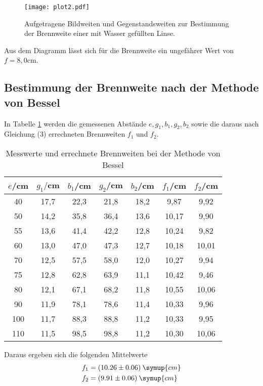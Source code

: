 \begin{figure}
  \centering
  \texttt{[image: plot2.pdf]}
  \caption{Aufgetragene Bildweiten und Gegenstandsweiten zur Bestimmung der Brennweite einer mit Wasser gefüllten Linse.}
  \label{fig:plot}
\end{figure}


Aus dem Diagramm lässt sich für die Brennweite ein ungefährer Wert von  $f = 8,0$cm.


\subsection{Bestimmung der Brennweite nach der Methode von Bessel}
In Tabelle \ref{tab:bessel} werden die gemessenen Abstände $e, g_1, b_1, g_2, b_2$ sowie die daraus nach Gleichung (3)
errechneten Brennweiten $f_1$ und $f_2$.
\begin{table}[H]
  \centering
  \caption{Messwerte und errechnete Brennweiten bei der Methode von Bessel}
  \label{tab:bessel}
  \begin{tabular}{c c c c c c c}
    \toprule
    $e$/cm  & $g_1/$cm & $b_1$/cm & $g_2$/cm & $b_2$/cm & $f_1$/cm & $f_2$/cm \\
    \midrule
    40  &   17,7  & 22,3  &  21,8 &   18,2 & 9,87  & 9,92 \\
    50   &  14,2  & 35,8   & 36,4  &  13,6 & 10,17 & 9,90 \\
    55   &  13,6  & 41,4   & 42,2  &  12,8 & 10,24 & 9,82 \\
    60  &   13,0  & 47,0   & 47,3  &  12,7 & 10,18 & 10,01 \\
    70  &   12,5 &  57,5  &  58,0  &  12,0 & 10,27 & 9,94 \\
    75  &   12,8 &  62,8  &  63,9  &  11,1 & 10,42 & 9,46 \\
    80  &   12,1 &  67,1  &  68,2  &  11,8 & 10,55 & 10,06 \\
    90  &   11,9 &  78,1  &  78,6  &  11,4 & 10,33 & 9,96 \\
    100  &  11,7 &  88,3  &  88,8  &  11,2 & 10,33 & 9,95 \\
    110  &  11,5 &  98,5  &  98,8  &  11,2 & 10,30 & 10,06  \\
    \bottomrule
  \end{tabular}
\end{table}

Daraus ergeben sich die folgenden Mittelwerte
\begin{align*}
  &f_1 = (10.26 \pm 0.06) \: \symup{cm} \\
  &f_2 = (9.91 \pm 0.06) \: \symup{cm}
\end{align*}

